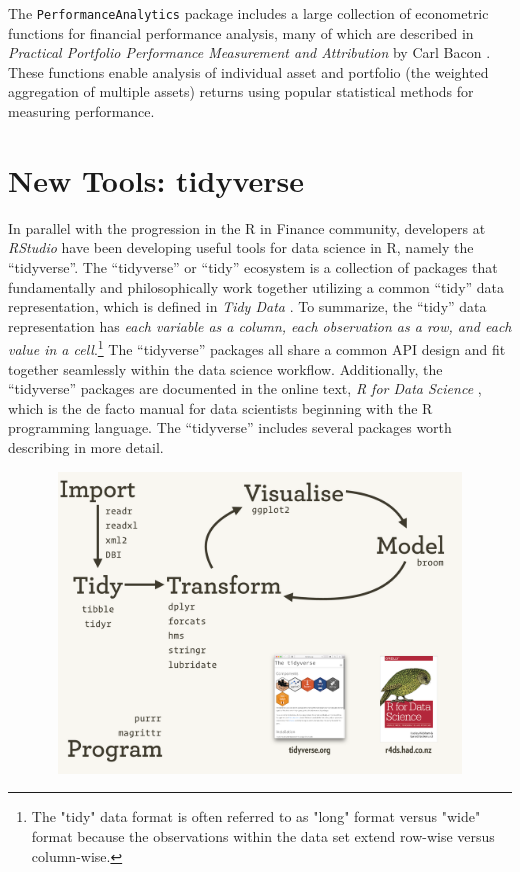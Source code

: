 The \texttt{PerformanceAnalytics} package includes a large collection of
econometric functions for financial performance analysis, many of which
are described in \emph{Practical Portfolio Performance Measurement and
Attribution} by Carl Bacon \citep{Bacon2004}. These functions enable
analysis of individual asset and portfolio (the weighted aggregation of
multiple assets) returns using popular statistical methods for measuring
performance.

\section{New Tools: tidyverse}\label{new-tools-tidyverse}

In parallel with the progression in the R in Finance community,
developers at \emph{RStudio} have been developing useful tools for data
science in R, namely the ``tidyverse''. The ``tidyverse'' or ``tidy''
ecosystem is a collection of packages that fundamentally and
philosophically work together utilizing a common ``tidy'' data
representation, which is defined in \emph{Tidy Data} \citep{tidy-data}.
To summarize, the ``tidy'' data representation has \emph{each variable
as a column, each observation as a row, and each value in a
cell}.\footnote{The "tidy" data format is often referred to as "long" format versus "wide" format because the observations within the data set extend row-wise versus column-wise. }
The ``tidyverse'' packages all share a common API design and fit
together seamlessly within the data science workflow. Additionally, the
``tidyverse'' packages are documented in the online text, \emph{R for
Data Science} \citep{R4DS2017}, which is the de facto manual for data
scientists beginning with the R programming language. The ``tidyverse''
includes several packages worth describing in more detail.

\begin{figure}[htbp]
  \centering
  \includegraphics[width=12cm, height=8cm]{img/tidyverse}
  \tidyverse
\end{figure}

